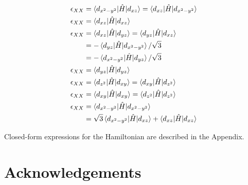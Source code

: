 \documentclass[twocolumn,showpacs,preprintnumbers,superscriptaddress,prb,floatfix,aps,10pt]{revtex4-1}
\newcommand*{\ham}{\hat{H}}
\begin{document}
\begin{align}
\epsilon_{XX} &
= \braket{d_{x^2-y^2} | \ham | d_{xz}}
= \braket{d_{xz} | \ham | d_{x^2-y^2}} \\
\epsilon_{XX} &
= \braket{d_{xz} | \ham | d_{xz}} \\
\epsilon_{XX} &
= \braket{d_{xz} | \ham | d_{yz}}
= \braket{d_{yz} | \ham | d_{xz}} \\
&
=-\braket{d_{yz} | \ham | d_{x^2-y^2}}/\sqrt{3} \\
&
=-\braket{d_{x^2-y^2} | \ham | d_{yz}}/\sqrt{3} \\
\epsilon_{XX} &
= \braket{d_{yz} | \ham | d_{yz}} \\
\epsilon_{XX} &
= \braket{d_{z^2}| \ham | d_{xy}}
= \braket{d_{xy} | \ham | d_{z^2}} \\
\epsilon_{XX} &
= \braket{d_{xy}  | \ham | d_{xy}}
= \braket{d_{z^2} | \ham | d_{z^2}} \\
\epsilon_{XX} &
= \braket{d_{x^2-y^2} | \ham | d_{x^2-y^2}} \\
&
= \sqrt{3} \braket{d_{x^2-y^2} | \ham | d_{xz}} 
         + \braket{d_{xz}      | \ham | d_{xz}} \\
\end{align}

Closed-form expressions for the Hamiltonian are described in the Appendix.

\section{Acknowledgements}


\clearpage
\appendix
\end{document}
